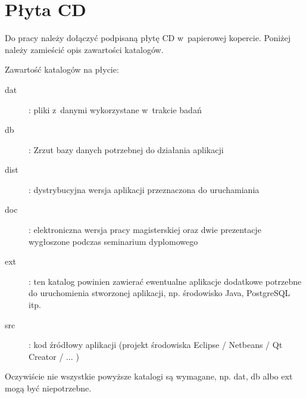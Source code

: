 \chapter{Płyta CD}\label{app:plyta}

\begin{figure}[htb]
\makebox[\textwidth]{\framebox[12.8cm]{\rule{0pt}{12.8cm}}}
\end{figure}
\pagebreak
{\color{red} Do pracy należy dołączyć podpisaną płytę CD w~papierowej kopercie. Poniżej należy zamieścić opis zawartości katalogów.}

Zawartość katalogów na płycie:
\begin{description}
\item[dat] : {\color{red} pliki z~danymi wykorzystane w~trakcie badań}
\item[db] : {\color{red} Zrzut bazy danych potrzebnej do działania aplikacji}
\item[dist] : dystrybucyjna wersja aplikacji przeznaczona do uruchamiania
\item[doc] : elektroniczna wersja pracy magisterskiej oraz dwie prezentacje wygłoszone podczas seminarium dyplomowego
\item[ext] : {\color{red} ten katalog powinien zawierać ewentualne aplikacje dodatkowe potrzebne do uruchomienia stworzonej aplikacji, np. środowisko Java, PostgreSQL itp.}
\item[src] : kod źródłowy aplikacji {\color{red}(projekt środowiska Eclipse / Netbeans / Qt Creator / ... })
\end{description}

{\color{red} Oczywiście nie wszystkie powyższe katalogi są wymagane, np. dat, db albo ext mogą być niepotrzebne.}